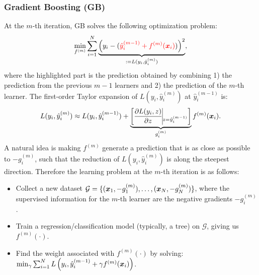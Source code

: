        
        
        
\subsubsection{Gradient Boosting (GB)}
        At the $m$-th iteration, GB solves the following optimization problem:
            \begin{equation}\label{XGBoost-model}
                \min_{f^{(m)}} \sum_{i=1}^{N}{
                    \underbrace{\left( y_i - (\textcolor{red}{\hat{y}^{(m-1)}_i + f^{(m)}(\bm{x}_i) } )  \right)^2}_{:=L(y_i, \hat{y}_i^{(m)}) },
                }
            \end{equation}
        where the highlighted part is the prediction obtained by combining 1) the prediction from the previous $m-1$ learners and 2) the prediction of the $m$-th learner. 
        The first-order Taylor expansion of $L(y_i, \hat{y}_i^{(m)})$ at $\hat{y}_i^{(m-1)}$ is:
            \begin{equation}
                L(y_i, \hat{y}_i^{(m)}) \approx L(y_i, \hat{y}_i^{(m-1)}) + \underbrace{\left[ \frac{\partial L(y_i, z)}{\partial z}\vline_{z = \hat{y}_i^{(m-1)}} \right]}_{g_{i}^{(m)}}  f^{(m)}(\bm{x}_i).
            \end{equation}
        A natural idea is making $f^{(m)}$ generate a prediction that is as close as possible to $-g^{(m)}_i$, such that the reduction of $L(y_i, \hat{y}_i^{(m)})$ is along the steepest direction.
        Therefore the learning problem  at the $m$-th iteration is as follows:
            \begin{itemize}
                \item  Collect a new dataset $\mathcal{G}=\{ (\bm{x}_1, -g^{(m)}_1), \ldots, (\bm{x}_N, -g^{(m)}_N) \}$, where the supervised information for the $m$-th learner are the negative gradients $-g_i^{(m)}$.
                \item  Train a regression/classification model (typically, a tree) on $\mathcal{G}$, giving us $f^{(m)}(\cdot)$. 
                \item  Find the weight associated with $f^{(m)}(\cdot)$ by solving: $\min_{\gamma} \sum_{i=1}^{N}{L\left(y_i, \hat{y}_i^{(m-1)} + \gamma f^{(m)}(\bm{x}_i)\right)}$.
            \end{itemize}



